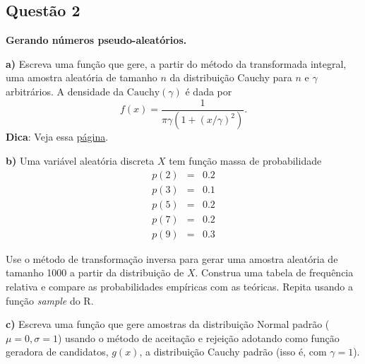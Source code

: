 \documentclass[
  a4paper]{article}
\begin{document}
\hypertarget{questuxe3o-2}{%
\subsection{\texorpdfstring{\textbf{Questão
2}}{Questão 2}}\label{questuxe3o-2}}

\textbf{Gerando números pseudo-aleatórios.}

\textbf{a)} Escreva uma função que gere, a partir do método da
transformada integral, uma amostra aleatória de tamanho \(n\) da
distribuição Cauchy para \(n\) e \(\gamma\) arbitrários. A densidade da
\(\text{Cauchy}(\gamma)\) é dada por
\[f(x)=\frac{1}{\pi \gamma (1 + (x/\gamma)^2)}.\] \textbf{Dica}: Veja
essa \href{https://en.wikipedia.org/wiki/Cauchy_distribution}{página}.

\vspace{.5cm}

\textbf{b)} Uma variável aleatória discreta \(X\) tem função massa de
probabilidade \begin{eqnarray*}
p(2)&=&0.2\\
p(3)&=&0.1\\
p(5)&=&0.2\\
p(7)&=&0.2\\
p(9)&=&0.3
\end{eqnarray*}

Use o método de transformação inversa para gerar uma amostra aleatória
de tamanho 1000 a partir da distribuição de \(X\). Construa uma tabela
de frequência relativa e compare as probabilidades empíricas com as
teóricas. Repita usando a função \emph{sample} do R.

\vspace{.5cm}

\textbf{c)} Escreva uma função que gere amostras da distribuição Normal
padrão (\(\mu=0, \sigma=1\)) usando o método de aceitação e rejeição
adotando como função geradora de candidatos, \(g(x)\), a distribuição
Cauchy padrão (isso é, com \(\gamma=1\)).
\end{document}
